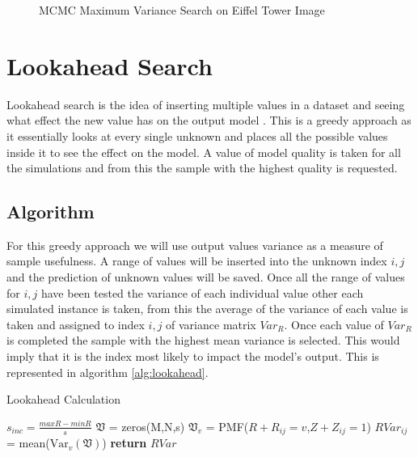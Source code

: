 \begin{figure}[!htbp]
  \begin{center}
    \resizebox{\textwidth}{!}{}
  \end{center}
    \caption{MCMC Maximum Variance Search on Eiffel Tower Image}
    \label{fig:eiffel_max_var_search}
\end{figure}


\section{Lookahead Search}

Lookahead search is the idea of inserting multiple values in a dataset and seeing what effect the new value has on the output model \cite{bayelookahead}. This is a greedy approach as it essentially looks at every single unknown and places all the possible values inside it to see the effect on the model. A value of model quality is taken for all the simulations and from this the sample with the highest quality is requested.

\subsection{Algorithm}
For this greedy approach we will use output values variance as a measure of sample usefulness. A range of values will be inserted into the unknown index $i,j$ and the prediction of unknown values will be saved. Once all the range of values for $i,j$ have been tested the variance of each individual value other each simulated instance is taken, from this the average of the variance of each value is taken and assigned to index $i,j$ of variance matrix $Var_{R}$. Once each value of $Var_{R}$ is completed the sample with the highest mean variance is selected. This would imply that it is the index most likely to impact the model's output. This is represented in algorithm \ref{alg:lookahead}.


\begin{algorithm}
\caption{Lookahead Calculation}\label{alg:lookahead}
\begin{algorithmic}[1]
 
\State $s_{inc} = \frac{maxR - minR}{s}$
\State $\mathfrak{V}$ = zeros(M,N,s) 
 
\State $\mathfrak{V}_v$ = PMF($R + R_{ij}=v$,$Z+Z_{ij}=1$) 
\EndFor
\State $RVar_{ij}$ = mean($\mathrm{Var}_v(\mathfrak{V})$)  
\EndFor
\EndFor
\State \textbf{return} $RVar$
\EndProcedure
\end{algorithmic}
\end{algorithm}

